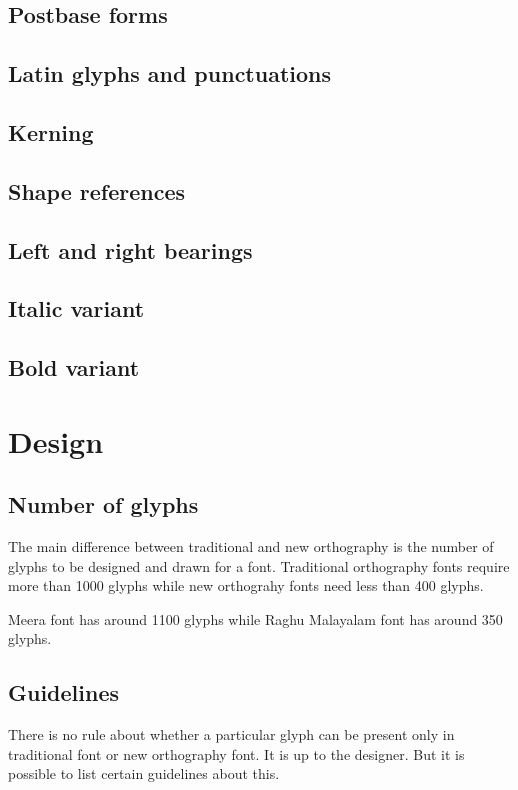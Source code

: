 \subsection {Postbase forms}
\subsection {Latin glyphs and punctuations}
\subsection {Kerning}
\subsection {Shape references}
\subsection {Left and right bearings}
\subsection {Italic variant}
\subsection {Bold variant}

\section{Design}
\subsection{Number of glyphs}

The main difference between traditional and new orthography is the number of
glyphs to be designed and drawn for a font.
Traditional orthography fonts require more than 1000 glyphs while new orthograhy
fonts need less than 400 glyphs.

Meera font has around 1100 glyphs while Raghu Malayalam font has around 350
glyphs.

\subsection{Guidelines}

There is no rule about whether a particular glyph can be present only in
traditional font or new orthography font. It is up to the designer. But it is
possible to list certain guidelines about this.

